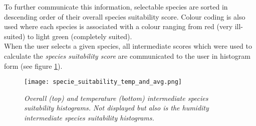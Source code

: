 To further communicate this information, selectable species are sorted in descending order of their overall species suitability score. Colour coding is also used where each species is associated with a colour ranging from red (very ill-suited) to light green (completely suited).\\

When the user selects a given species, all intermediate scores which were used to calculate the \textit{species suitability score} are communicated to the user in histogram form (see figure \ref{fig:specie_intermediate_suitability_scores}).

\begin{figure}
\center
	\texttt{[image: specie\_suitability\_temp\_and\_avg.png]}
	\caption{ \textit{Overall (top) and temperature (bottom) intermediate species suitability histograms. Not displayed but also is the humidity intermediate species suitability histograms.}}	
	\label{fig:specie_intermediate_suitability_scores}
\end{figure}


